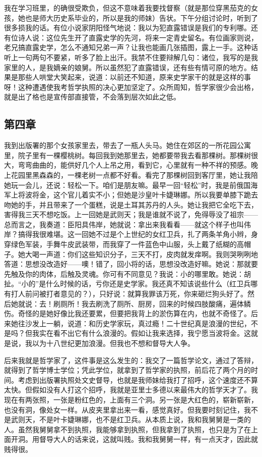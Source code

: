 我在学习班里，的确很受欺负，但这不意味着我要找督察（就是那位穿黑茄克的女孩，她也是师大历史系毕业的，所以是我的师妹）告状。下午分组讨论时，听到了很多损我的话。有位小说家阴阳怪气地说：我以为犯直露错误是我们的专利哪。还有位诗人说：这位先生开了直露史学的先河，将来一定青史留名。有位画家则说，老兄搞直露史学，怎么不通知兄弟一声？让我也能画几张插图，露上一手。这种话听上一句两句不要紧，听多了脸上出汗。我禁不住要辩解几句：诸位，我写的是我家里的人，是我嫡亲的娘舅。所以虽然犯了直露错误，还有些有情可原的地方。结果是那些人哄堂大笑起来，说道：以前还不知道，原来史学家干的就是这样的事呀！这种遭遇使我考哲学执照的决心更加坚定了。众所周知，哲学家很少会出格，就是出了格也是宣传部直接管，不会落到层次如此之低。

\subsection{第四章}


我到出版署的那个女孩家里去，带去了一瓶人头马。她住在郊区的一所花园公寓里，院子里有一棵樱桃树。每回我到她那里去，她都要带我去看那棵树。那棵树很大，弯弯曲曲的，能供好几个人上吊之用，看到它，心里就有一种不祥的预感。晚上花园里黑森森的，一棵老树一点都不好看。看完了那棵树回到客厅里，她让我陪她玩一会儿，还说：轻松一下。咱们是朋友嘛。最早一回“轻松”时，我是前俄国海军上将波将金，这个官儿着实不小；但她是沙皇叶卡婕琳娜。所以我要单膝下跪去吻她的手，并且带来了一个蛋糕，说是土耳其苏丹的人头。她让我把它全吃下去，害得我三天不想吃饭。上一回她是武则天；我是谁就不说了，免得辱没了祖宗——总而言之，我奏道：臣阳具伟岸，她就说：拿出来我看看——就这个样子也叫伟岸？搞得我很难堪。这一回她不过是个上世纪的女红卫兵，扎了两条羊角小辫，身穿绿色军装，手舞牛皮武装带，而我穿了一件蓝色中山服，头上戴了纸糊的高帽子。她大喝一声道：你们这些知识分子，三天不打，皮肉就发痒啊。我则哭咧咧地答道：思想没改造好——噢！错了，回小将的话，思想没改造好嘛。她说：那就要先触及你的肉体，后触及灵魂。你可有不同意见？我说：小的哪里敢。她说：胡扯。“小的”是什么时候的话，亏你还是史学家。我还真不知该说些什么（红卫兵哪有打人前问被打者意见的？），只好说：就算我罪该万死，你来砸烂狗头好了。然后她就说：去！刷厕所！我去刷洗了厕所、厨房，回来的时候四肢酸痛，遍体鳞伤。奇怪的是她好像比我还要累，但要把我背上的淤伤算在内，也就不奇怪了。后来她往沙发上一躺，说道：和历史学家玩，真过瘾！二十世纪真是浪漫的世纪，不是吗？但我实在看不出它有什么浪漫的。假如让我来选择，我宁愿当波将金。这就是说，我以为十八世纪更加浪漫。但我也不想和督导大人争。 

后来我就是哲学家了，这件事是这么发生的：我交了一篇哲学论文，通过了答辩，就得到了哲学博士学位；凭此学位，就拿到了哲学家的执照，前后花了两个月的时间。考虑到出版署执照处文史督导，也就是我师妹给我打了招呼，这个速度还不算太快。但假如没有人打这个招呼，我就是亚里士多德以来最伟大的哲学天才了。我现在有两张照，一张是粉红色的，上面有三个洞。另一张是大红色的，崭新崭新，也没有洞，像处女一样。从皮夹里拿出来一看，感觉真好。但我要时刻记住，我不是武则天，不是叶卡婕琳娜，也不是红卫兵。从本质上说，我和我舅舅是一类的人。虽然我舅舅拿不到执照，我能够拿到执照，但我拿到了执照，也只是为了在上面开洞。用督导大人的话来说，这就叫贱。我和我舅舅一样，有一点天才，因此就贱得很。 

